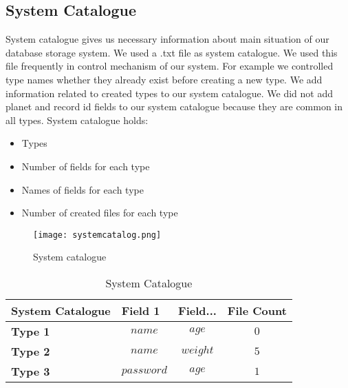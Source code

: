 \documentclass{article}
\begin{document}
 \subsection{System Catalogue}
 System catalogue gives us necessary information about main situation of our database storage system. We used a .txt file as system catalogue. We used this file frequently in control mechanism of our system. For example we controlled type names whether they already exist before creating a new type. We add information related to created types to our system catalogue. We did not add planet and record id fields to our system catalogue because they are common in all types. System catalogue holds:
 \begin{itemize}
 \item Types
 \item Number of fields for each type
 \item Names of fields for each type
 \item Number of created files for each type
 \end{itemize}
 \begin{figure}[H]
    \centering
    \texttt{[image: systemcatalog.png]}
    \caption{System catalogue}
\end{figure}
\begin{table}[H]
\centering
\begin{tabular}{|l|c|c|c}
\hline
\textbf{System Catalogue}   & \multicolumn{1}{l|}{\textbf{Field 1}} & \multicolumn{1}{l|}{\textbf{Field...}} & \multicolumn{1}{l|}{\textbf{File Count}} \\ \hline
\textbf{Type 1} & $name$         & $age$          & $0$           \\ \hline
\textbf{Type 2} & $name$         & $weight$          & $5$           \\ \hline
\textbf{Type 3} & $password$         & $age$          & $1$           \\ \hline
\end{tabular}
\label{tab:ex}
\caption{System Catalogue}
\end{table}
\end{document}
